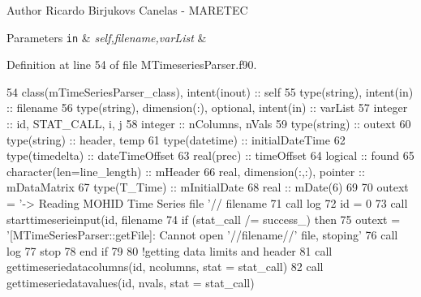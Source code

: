 \begin{DoxyAuthor}{Author}
Ricardo Birjukovs Canelas -\/ M\+A\+R\+E\+T\+EC 
\end{DoxyAuthor}

\begin{DoxyParams}[1]{Parameters}
\mbox{\tt in}  & {\em self,filename,var\+List} & \\
\hline
\end{DoxyParams}


Definition at line 54 of file M\+Timeseries\+Parser.\+f90.


\begin{DoxyCode}
54     \textcolor{keywordtype}{class}(mTimeSeriesParser\_class), \textcolor{keywordtype}{intent(inout)} :: self
55     \textcolor{keywordtype}{type}(string), \textcolor{keywordtype}{intent(in)} :: filename
56     \textcolor{keywordtype}{type}(string), \textcolor{keywordtype}{dimension(:)}, \textcolor{keywordtype}{optional}, \textcolor{keywordtype}{intent(in)} :: varList
57     \textcolor{keywordtype}{integer} :: id, STAT\_CALL, i, j
58     \textcolor{keywordtype}{integer} :: nColumns, nVals
59     \textcolor{keywordtype}{type}(string) :: outext
60     \textcolor{keywordtype}{type}(string) :: header, temp
61     \textcolor{keywordtype}{type}(datetime) :: initialDateTime
62     \textcolor{keywordtype}{type}(timedelta) :: dateTimeOffset
63     \textcolor{keywordtype}{real(prec)} :: timeOffset
64     \textcolor{keywordtype}{logical} :: found
65     \textcolor{keywordtype}{character(len=line\_length)} :: mHeader
66     \textcolor{keywordtype}{real}, \textcolor{keywordtype}{dimension(:,:)}, \textcolor{keywordtype}{pointer} :: mDataMatrix
67     \textcolor{keywordtype}{type}(T\_Time) :: mInitialDate
68     \textcolor{keywordtype}{real} :: mDate(6)
69 
70     outext = \textcolor{stringliteral}{'-> Reading MOHID Time Series file '}// filename
71     \textcolor{keyword}{call }log%
72     id = 0
73     \textcolor{keyword}{call }starttimeserieinput(id, filename%
74     \textcolor{keywordflow}{if} (stat\_call /= success\_) \textcolor{keywordflow}{then}
75         outext = \textcolor{stringliteral}{'[MTimeSeriesParser::getFile]: Cannot open '}//filename//\textcolor{stringliteral}{' file, stoping'}
76         \textcolor{keyword}{call }log%
77         stop
78 \textcolor{keywordflow}{    end if}
79 
80     \textcolor{comment}{!getting data limits and header}
81     \textcolor{keyword}{call }gettimeseriedatacolumns(id, ncolumns, stat = stat\_call)
82     \textcolor{keyword}{call }gettimeseriedatavalues(id, nvals, stat = stat\_call)

\end{DoxyCode}
